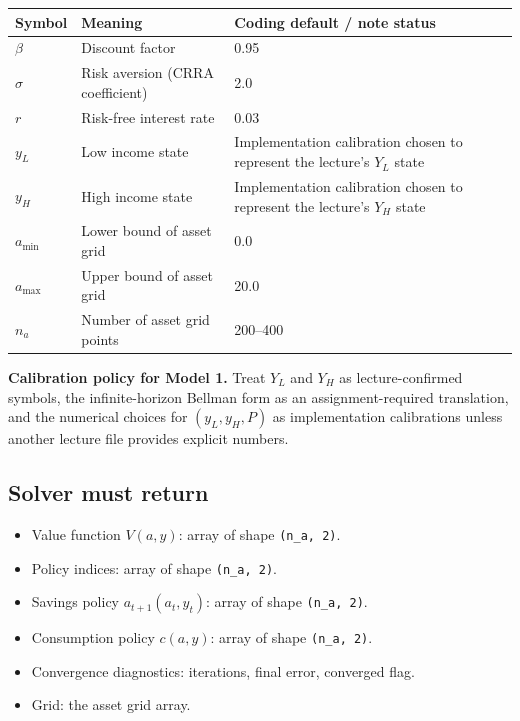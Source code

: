 \documentclass[11pt]{article}
\begin{document}
\begin{tabularx}{\linewidth}{@{}lXl@{}}
\toprule
\textbf{Symbol} & \textbf{Meaning} & \textbf{Coding default / note status} \\
\midrule
$\beta$ & Discount factor & 0.95 \\
$\sigma$ & Risk aversion (CRRA coefficient) & 2.0 \\
$r$ & Risk-free interest rate & 0.03 \\
$y_L$ & Low income state & Implementation calibration chosen to represent the lecture's $Y_L$ state \\
$y_H$ & High income state & Implementation calibration chosen to represent the lecture's $Y_H$ state \\
$a_{\min}$ & Lower bound of asset grid & 0.0 \\
$a_{\max}$ & Upper bound of asset grid & 20.0 \\
$n_a$ & Number of asset grid points & 200--400 \\
\bottomrule
\end{tabularx}

\begin{notebox}
\textbf{Calibration policy for Model 1.} Treat $Y_L$ and $Y_H$ as lecture-confirmed symbols, the infinite-horizon Bellman form as an assignment-required translation, and the numerical choices for $(y_L,y_H,P)$ as implementation calibrations unless another lecture file provides explicit numbers.
\end{notebox}

\subsection{Solver must return}
\begin{itemize}
    \item Value function $V(a,y)$: array of shape \texttt{(n\_a, 2)}.
    \item Policy indices: array of shape \texttt{(n\_a, 2)}.
    \item Savings policy $a_{t+1}(a_t,y_t)$: array of shape \texttt{(n\_a, 2)}.
    \item Consumption policy $c(a,y)$: array of shape \texttt{(n\_a, 2)}.
    \item Convergence diagnostics: iterations, final error, converged flag.
    \item Grid: the asset grid array.
\end{itemize}
\end{document}
